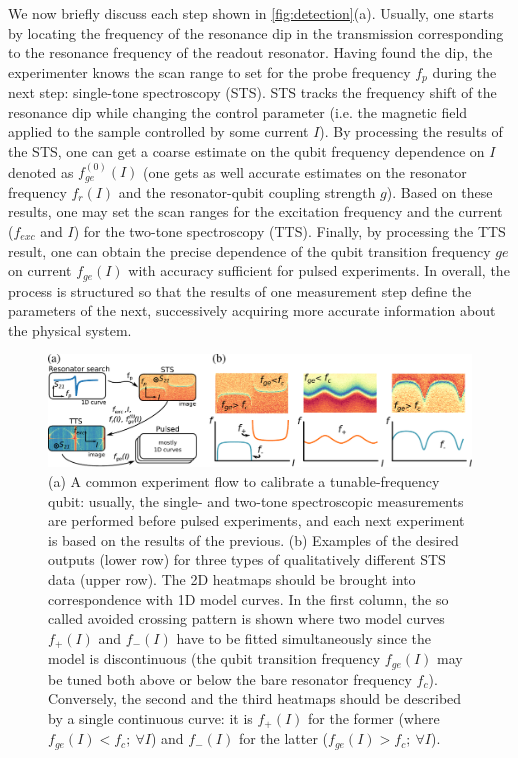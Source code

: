 \documentclass[%
 aip,
 draft,
 amsmath,amssymb,
 reprint,%
]{revtex4-1}
\begin{document}
We now briefly discuss each step shown in \autoref{fig:detection}(a). Usually, one starts by locating the frequency of the resonance dip in the transmission corresponding to the resonance frequency of the readout resonator. Having found the dip, the experimenter knows the scan range to set for the probe frequency $f_p$ during the next step: single-tone spectroscopy (STS). STS tracks the frequency shift of the resonance dip while changing the control parameter (i.e. the magnetic field applied to the sample controlled by some current $I$). By processing the results of the STS, one can get a coarse estimate on the qubit frequency dependence on $I$  denoted as  $f^{(0)}_{ge}(I)$ (one gets as well accurate estimates on the resonator frequency $f_r(I)$ and the resonator-qubit coupling strength $g$). Based on these results, one may set the scan ranges for the excitation frequency and the current ($f_{exc}$ and $I$) for the two-tone spectroscopy (TTS). Finally, by processing the TTS result, one can obtain the precise dependence of the qubit transition frequency  $ge$ on current $f_{ge}(I)$	 with accuracy sufficient for pulsed experiments. In overall, the process is structured so that the results of one measurement step define the parameters of the next, successively acquiring more accurate information about the physical system.

\begin{figure}
	\centering
	\includegraphics[width=0.95\linewidth]{detection_sts}
	\caption{(a) A common experiment flow to calibrate a tunable-frequency qubit: usually, the single- and two-tone spectroscopic measurements are performed before pulsed experiments, and each next experiment is based on the results of the previous. (b) Examples of the desired outputs (lower row) for three types of qualitatively different STS data (upper row). The 2D heatmaps should be brought into correspondence with 1D model curves. In the first column, the so called avoided crossing pattern is shown where two model curves $f_+(I)$ and $f_-(I)$ have to be fitted simultaneously since the model is discontinuous (the qubit transition frequency $f_{ge}(I)$ may be tuned both above or below the bare resonator frequency $f_c$). Conversely, the second and the third heatmaps should be described by a single continuous curve: it is $f_+(I)$ for the former (where $f_{ge}(I)<f_c;\ \forall I$) and $f_-(I)$ for the latter ($f_{ge}(I)>f_c;\ \forall I$).}
	\label{fig:detection}	
\end{figure} 
\end{document}
